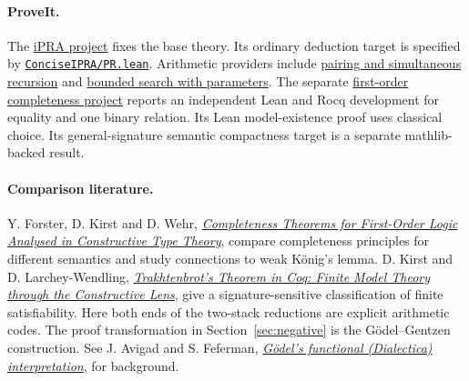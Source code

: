 \paragraph{ProveIt.}
The \href{https://github.com/VladimirReshetnikov/ProveIt/tree/bbb85238dac533fc4b7b84a750cca864fe35fed5/Logic/PrimitiveRecursiveArithmetic}{iPRA project} fixes the base theory. Its ordinary deduction target is specified by \href{https://github.com/VladimirReshetnikov/ProveIt/blob/bbb85238dac533fc4b7b84a750cca864fe35fed5/Logic/PrimitiveRecursiveArithmetic/ConciseIPRA/Lean/ConciseIPRA/PR.lean}{\texttt{ConciseIPRA/PR.lean}}. Arithmetic providers include \href{https://github.com/VladimirReshetnikov/ProveIt/blob/bbb85238dac533fc4b7b84a750cca864fe35fed5/Logic/PrimitiveRecursiveArithmetic/Derivations/Lean/IPRADerivations/Core/Pairing.lean}{pairing and simultaneous recursion} and \href{https://github.com/VladimirReshetnikov/ProveIt/blob/bbb85238dac533fc4b7b84a750cca864fe35fed5/Logic/PrimitiveRecursiveArithmetic/Derivations/Lean/IPRADerivations/Core/SearchParameters.lean}{bounded search with parameters}. The separate \href{https://github.com/VladimirReshetnikov/ProveIt/tree/bbb85238dac533fc4b7b84a750cca864fe35fed5/Logic/FirstOrder}{first-order completeness project} reports an independent Lean and Rocq development for equality and one binary relation. Its Lean model-existence proof uses classical choice. Its general-signature semantic compactness target is a separate mathlib-backed result.

\paragraph{Comparison literature.}
Y. Forster, D. Kirst and D. Wehr, \href{https://arxiv.org/abs/2006.04399}{\emph{Completeness Theorems for First-Order Logic Analysed in Constructive Type Theory}}, compare completeness principles for different semantics and study connections to weak König's lemma. D. Kirst and D. Larchey-Wendling, \href{https://arxiv.org/abs/2104.14445}{\emph{Trakhtenbrot's Theorem in Coq: Finite Model Theory through the Constructive Lens}}, give a signature-sensitive classification of finite satisfiability. Here both ends of the two-stack reductions are explicit arithmetic codes. The proof transformation in Section~\ref{sec:negative} is the Gödel--Gentzen construction. See J. Avigad and S. Feferman, \href{https://math.stanford.edu/~feferman/papers/dialectica.pdf}{\emph{Gödel's functional (Dialectica) interpretation}}, for background.

